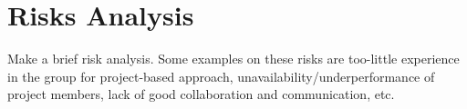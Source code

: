 \chapter{Risks Analysis } Make a brief risk analysis. Some examples on these risks are  too-little experience in the group for project-based approach, 
unavailability/underperformance of project members, lack of good 
collaboration and communication, etc.
